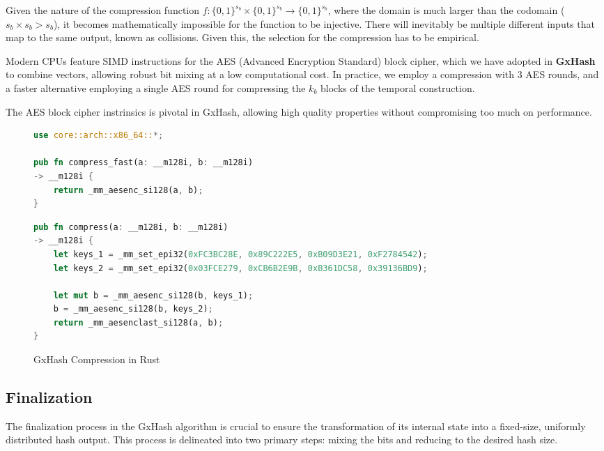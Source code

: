 \documentclass[10pt]{article}
\begin{document}
Given the nature of the compression function \( f: \{0,1\}^{s_b} \times \{0,1\}^{s_b} \to \{0,1\}^{s_b} \), where the domain is much larger than the codomain (\( s_b \times s_b > s_b \)), it becomes mathematically impossible for the function to be injective. There will inevitably be multiple different inputs that map to the same output, known as collisions. Given this, the selection for the compression has to be empirical.

Modern CPUs feature SIMD instructions for the AES (Advanced Encryption Standard) block cipher, which we have adopted in \textbf{GxHash} to combine vectors, allowing robust bit mixing at a low computational cost. In practice, we employ a compression with 3 AES rounds, and a faster alternative employing a single AES round for compressing the \( k_b \) blocks of the temporal construction.

The AES block cipher instrinsics is pivotal in GxHash, allowing high quality properties without compromising too much on performance.

\begin{figure}[H]
\begin{multicols}{2}
\begin{lstlisting}[language=Rust, style=boxed]
use core::arch::x86_64::*;

pub fn compress_fast(a: __m128i, b: __m128i)
-> __m128i {
    return _mm_aesenc_si128(a, b);
}
\end{lstlisting}
\columnbreak
\begin{lstlisting}[language=Rust, style=boxed]
pub fn compress(a: __m128i, b: __m128i)
-> __m128i {
    let keys_1 = _mm_set_epi32(0xFC3BC28E, 0x89C222E5, 0xB09D3E21, 0xF2784542);
    let keys_2 = _mm_set_epi32(0x03FCE279, 0xCB6B2E9B, 0xB361DC58, 0x39136BD9);

    let mut b = _mm_aesenc_si128(b, keys_1);
    b = _mm_aesenc_si128(b, keys_2);
    return _mm_aesenclast_si128(a, b);
}
\end{lstlisting}
\end{multicols}
\caption{GxHash Compression in Rust}
\label{fig:compression_rust_example}
\end{figure}

\subsection{Finalization}

The finalization process in the GxHash algorithm is crucial to ensure the transformation of its internal state into a fixed-size, uniformly distributed hash output. This process is delineated into two primary steps: mixing the bits and reducing to the desired hash size.
\end{document}
